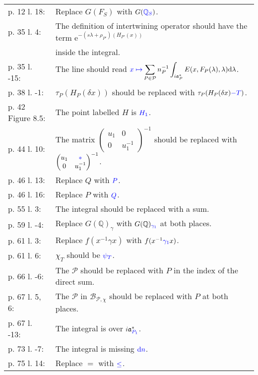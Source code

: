 \documentclass[11pt]{amsart}
\def\Q{\mathbb Q}
\def\PPP{\mathcal P}
\def\aaa{\mathfrak a}
\def\cb#1{{\color{blue}#1}}
\def\d{\text d}
\theoremstyle{remark}
\begin{document}
\begin{longtable} {ll}
	p. 12 l. 18: & Replace $G(F_S)$ with $G(\cb{\Q_S})$. \\[0.5em]
	p. 35 l. 4: & The definition of intertwining operator should have the term $\text{e}^{-(s\lambda + \rho_{P'})(H_{P'}(x))}$ \\ &  inside the integral. \\[0.5em]	
	p. 35 l. -15:  & The line should read ${\color{blue}x \mapsto} \displaystyle \sum_{P \in \PPP} n_P^{-1} \int_{i\aaa_P^*} E(x, F_P(\lambda), \lambda) \d \lambda$. \\[0.5em]
	p. 38 l. -1: & $\tau_P(H_P(\delta x))$ should be replaced with $\tau_P(H_P(\delta x) \cb{- T})$. \\[0.5em]
	p. 42 Figure 8.5: & The point labelled $H$ is $\cb{H_1}$. \\[0.5em]
	p. 44 l. 10: & The matrix $\begin{pmatrix} u_1 & 0 \\ 0 & u_1^{-1} \end{pmatrix}^{-1}$ should be replaced with $\begin{pmatrix} u_1 & \cb{*} \\ 0 & u_1^{-1} \end{pmatrix}^{-1}$. \\[0.5em]
	p. 46 l. 13: & Replace $Q$ with $\cb{P}$. \\[0.5em]
	p. 46 l. 16: & Replace $P$ with $\cb{Q}$. \\[0.5em]
	p. 55 l. 3: & The integral should be replaced with a \cb{sum}. \\[0.5em]
	p. 59 l. -4: & Replace $G(\Q)_\gamma$ with $G(\Q)_{\cb{\gamma_1}}$ at both places. \\[0.5em]
	p. 61 l. 3: & Replace $f(x^{-1} \gamma x)$ with $f(x^{-1} \cb{\gamma_1} x)$. \\[0.5em]
	p. 61 l. 6: & $\chi_T$ should be $\cb{\psi_T}$. \\[0.5em]
	p. 66 l. -6: & The $\PPP$ should be replaced with \cb{$P$} in the index of the direct sum.\\[0.5em]
	p. 67 l. 5, 6: & The $\PPP$ in $\mathcal B_{\PPP, \chi}$ should be replaced with \cb{$P$} at both places. \\[0.5em]
	p. 67 l. -13: & The integral is over $i\aaa_{\cb{P_1}}^*$. \\[0.5em]
	p. 73 l. -7: & The integral is missing $\cb{\d n}$. \\[0.5em]
	p. 75 l. 14: & Replace $=$ with $\cb{\leq}$. \\[0.5em]

\end{longtable}
\end{document}
